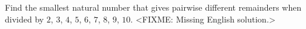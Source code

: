 \problem
Find the smallest natural number that gives pairwise different remainders when
divided by $2$, $3$, $4$, $5$, $6$, $7$, $8$, $9$, $10$.
\solution
<FIXME: Missing English solution.>
\endproblem
